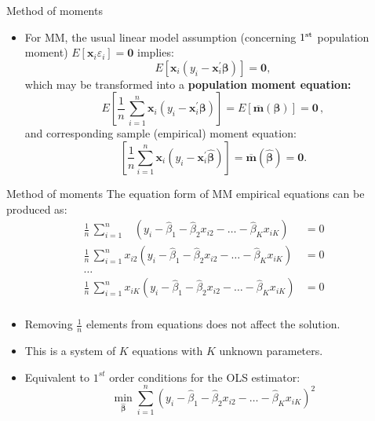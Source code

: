 \documentclass{beamer}
\begin{document}
\begin{frame}{Method of moments}
\begin{itemize}
\item For MM, the usual linear model assumption (concerning $1^{\textnormal{st}}$ population moment) $E[\bm{x}_i \varepsilon_i]=\bm{0}$ implies: $$E[\bm{x}_i(y_i-\bm{x}_i^{\prime}\bm{\beta})]=\bm{0},$$ 
which may be transformed into a \textbf{population moment equation:}
$$
E \left[ \frac{1}{n} \, \sum_{i=1}^n \bm{x}_i (y_i - \bm{x}_i^{\prime}\bm{\beta}) \right] 
= E \left[ \overline{\bm{m}}(\bm{\beta}) \right] = \bm{0}\,,
$$
and corresponding sample (empirical) moment equation:
$$
\left[ \frac{1}{n} \sum_{i=1}^n \bm{x}_i (y_i - \bm{x}_i^{\prime}\hat{\bm{\beta}}) \right]
= \overline{\bm{m}}(\hat{\bm{\beta}}) = \bm{0}.
$$
\end{itemize}
\end{frame}
\begin{frame}{Method of moments}
The equation form of MM empirical equations can be produced as:
\medskip
\footnotesize
\begin{equation*}
\begin{aligned}
\frac{1}{n}\, \sum_{i=1}^n ~~~~\left( y_i - \hat{\beta}_1 - \hat{\beta}_2 x_{i2} - \dots - \hat{\beta}_K x_{iK} \right) &= 0\\
\frac{1}{n}\, \sum_{i=1}^n  x_{i2} \left( y_i - \hat{\beta}_1 - \hat{\beta}_2 x_{i2} - \dots - \hat{\beta}_K x_{iK} \right) &= 0\\
\dots &\\
\frac{1}{n}\, \sum_{i=1}^n x_{iK} \left( y_i - \hat{\beta}_1 - \hat{\beta}_2 x_{i2} - \dots - \hat{\beta}_K x_{iK} \right) &= 0\\
\end{aligned}
\end{equation*}
\medskip
\begin{itemize}
    \item Removing $\frac{1}{n}$ elements from equations does not affect the solution.
    \item This is a system of $K$ equations with $K$ unknown parameters.
    \item Equivalent to $1^{st}$ order conditions for the OLS estimator:
    $$ \underset{\hat{\bm{\beta}}}{\min}\sum_{i=1}^n \left( y_i - \hat{\beta}_1 - \hat{\beta}_2 x_{i2} - \dots - \hat{\beta}_K x_{iK} \right)^2$$
\end{itemize}
\end{frame}
\end{document}
